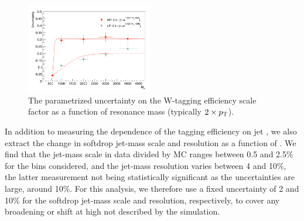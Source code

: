  \begin{figure}[h!]
 \centering
 \includegraphics[width=0.49\textwidth]{figures/vtagging/2017_sf/ptdep.png}
 \caption{The parametrized uncertainty on the W-tagging efficiency scale factor as a function of resonance mass (typically $2\times p_{\mathrm{T}}$).}
 \label{fig:searchIII:tau21ptdep}
 \end{figure}
In addition to measuring the dependence of the tagging efficiency on jet \PT, we  also extract the change in softdrop jet-mass scale and resolution as a function of \PT. We find that the jet-mass scale in data divided by MC ranges between 0.5 and 2.5\% for the \PT bins considered, and the jet-mass resolution varies between 4 and 10\%, the latter measurement not being statistically significant as the uncertainties are large, around 10\%. For this analysis, we therefore use a fixed uncertainty of 2 and 10\% for the softdrop jet-mass scale and resolution, respectively, to cover any broadening or shift at high \PT not described by the simulation.
   
\clearpage    
